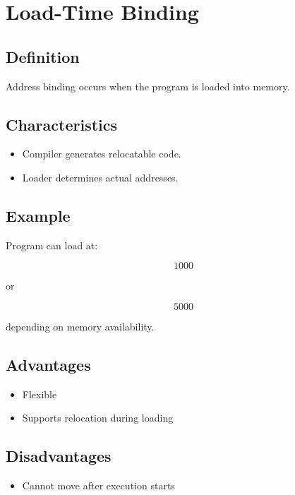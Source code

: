\section{Load-Time Binding}

\subsection{Definition}

Address binding occurs when the program is loaded into memory.

\subsection{Characteristics}

\begin{itemize}
\item Compiler generates relocatable code.
\item Loader determines actual addresses.
\end{itemize}

\subsection{Example}

Program can load at:

\[
1000
\]

or

\[
5000
\]

depending on memory availability.

\subsection{Advantages}

\begin{itemize}
\item Flexible
\item Supports relocation during loading
\end{itemize}

\subsection{Disadvantages}

\begin{itemize}
\item Cannot move after execution starts
\end{itemize}


